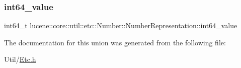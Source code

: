 \subsubsection{\texorpdfstring{int64\+\_\+value}{int64\_value}}
{\footnotesize\ttfamily int64\+\_\+t lucene\+::core\+::util\+::etc\+::\+Number\+::\+Number\+Representation\+::int64\+\_\+value}



The documentation for this union was generated from the following file\+:\begin{DoxyCompactItemize}
\item 
Util/\mbox{\hyperlink{Etc_8h}{Etc.\+h}}\end{DoxyCompactItemize}
